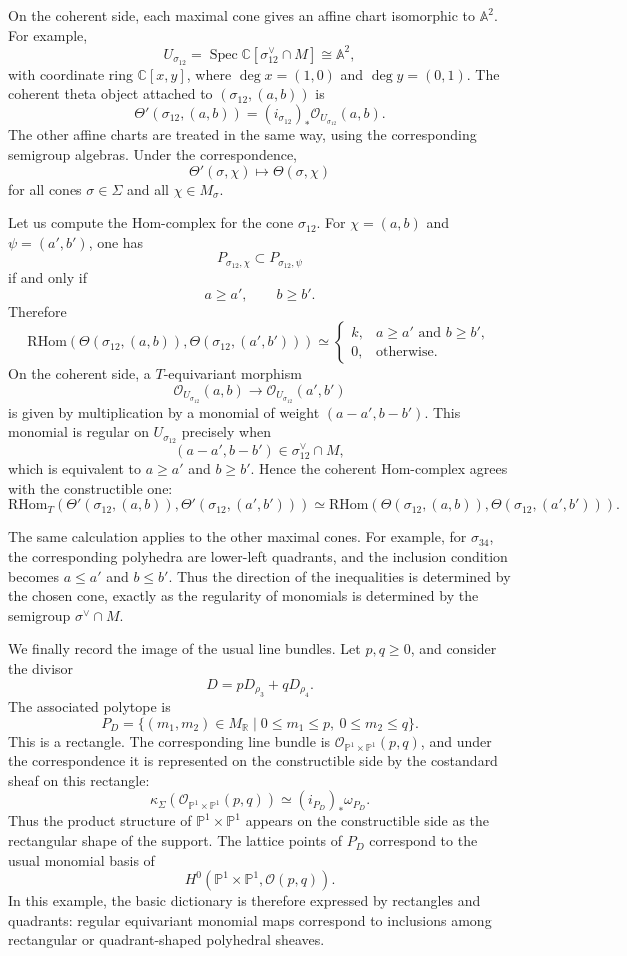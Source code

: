 On the coherent side, each maximal cone gives an affine chart isomorphic to \(\mathbb A^2\). For example,
\[
U_{\sigma_{12}}=\operatorname{Spec}\mathbb C[\sigma_{12}^\vee\cap M]
\cong \mathbb A^2,
\]
with coordinate ring \(\mathbb C[x,y]\), where \(\deg x=(1,0)\) and \(\deg y=(0,1)\). The coherent theta object attached to \((\sigma_{12},(a,b))\) is
\[
\Theta'(\sigma_{12},(a,b))
=
(i_{\sigma_{12}})_*\mathcal O_{U_{\sigma_{12}}}(a,b).
\]
The other affine charts are treated in the same way, using the corresponding semigroup algebras. Under the correspondence,
\[
\Theta'(\sigma,\chi)\longmapsto \Theta(\sigma,\chi)
\]
for all cones \(\sigma\in\Sigma\) and all \(\chi\in M_\sigma\).

Let us compute the Hom-complex for the cone \(\sigma_{12}\). For \(\chi=(a,b)\) and \(\psi=(a',b')\), one has
\[
P_{\sigma_{12},\chi}\subset P_{\sigma_{12},\psi}
\]
if and only if
\[
a\ge a',
\qquad
b\ge b'.
\]
Therefore
\[
\mathrm{RHom}(\Theta(\sigma_{12},(a,b)),\Theta(\sigma_{12},(a',b')))
\simeq
\begin{cases}
k, & a\ge a'\text{ and }b\ge b',\\
0, & \text{otherwise}.
\end{cases}
\]
On the coherent side, a \(T\)-equivariant morphism
\[
\mathcal O_{U_{\sigma_{12}}}(a,b)
\longrightarrow
\mathcal O_{U_{\sigma_{12}}}(a',b')
\]
is given by multiplication by a monomial of weight \((a-a',b-b')\). This monomial is regular on \(U_{\sigma_{12}}\) precisely when
\[
(a-a',b-b')\in\sigma_{12}^\vee\cap M,
\]
which is equivalent to \(a\ge a'\) and \(b\ge b'\). Hence the coherent Hom-complex agrees with the constructible one:
\[
\mathrm{RHom}_T(\Theta'(\sigma_{12},(a,b)),\Theta'(\sigma_{12},(a',b')))
\simeq
\mathrm{RHom}(\Theta(\sigma_{12},(a,b)),\Theta(\sigma_{12},(a',b'))).
\]

The same calculation applies to the other maximal cones. For example, for \(\sigma_{34}\), the corresponding polyhedra are lower-left quadrants, and the inclusion condition becomes \(a\le a'\) and \(b\le b'\). Thus the direction of the inequalities is determined by the chosen cone, exactly as the regularity of monomials is determined by the semigroup \(\sigma^\vee\cap M\).

We finally record the image of the usual line bundles. Let \(p,q\ge 0\), and consider the divisor
\[
D=pD_{\rho_3}+qD_{\rho_4}.
\]
The associated polytope is
\[
P_D
=
\{(m_1,m_2)\in M_{\mathbb R}\mid
0\le m_1\le p,\ 0\le m_2\le q\}.
\]
This is a rectangle. The corresponding line bundle is \(\mathcal O_{\mathbb P^1\times\mathbb P^1}(p,q)\), and under the correspondence it is represented on the constructible side by the costandard sheaf on this rectangle:
\[
\kappa_\Sigma(\mathcal O_{\mathbb P^1\times\mathbb P^1}(p,q))
\simeq
(i_{P_D})_*\omega_{P_D}.
\]
Thus the product structure of \(\mathbb P^1\times\mathbb P^1\) appears on the constructible side as the rectangular shape of the support. The lattice points of \(P_D\) correspond to the usual monomial basis of
\[
H^0(\mathbb P^1\times\mathbb P^1,\mathcal O(p,q)).
\]
In this example, the basic dictionary is therefore expressed by rectangles and quadrants: regular equivariant monomial maps correspond to inclusions among rectangular or quadrant-shaped polyhedral sheaves.


